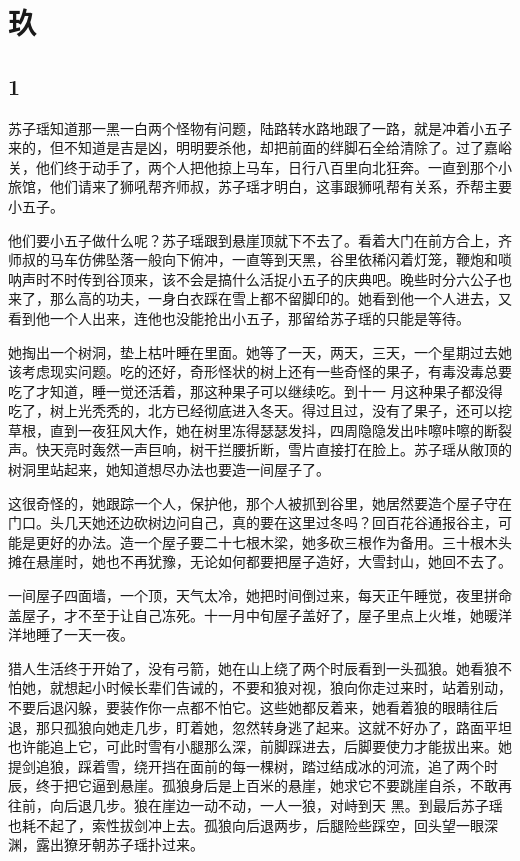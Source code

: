 \section{玖}

{\centering\subsection{1}}

苏子瑶知道那一黑一白两个怪物有问题，陆路转水路地跟了一路，就是冲着小五子来的，但不知道是吉是凶，明明要杀他，却把前面的绊脚石全给清除了。过了嘉峪关，他们终于动手了，两个人把他掠上马车，日行八百里向北狂奔。一直到那个小旅馆，他们请来了狮吼帮齐师叔，苏子瑶才明白，这事跟狮吼帮有关系，乔帮主要小五子。

他们要小五子做什么呢？苏子瑶跟到悬崖顶就下不去了。看着大门在前方合上，齐师叔的马车仿佛坠落一般向下俯冲，一直等到天黑，谷里依稀闪着灯笼，鞭炮和唢呐声时不时传到谷顶来，该不会是搞什么活捉小五子的庆典吧。晚些时分六公子也来了，那么高的功夫，一身白衣踩在雪上都不留脚印的。她看到他一个人进去，又看到他一个人出来，连他也没能抢出小五子，那留给苏子瑶的只能是等待。

她掏出一个树洞，垫上枯叶睡在里面。她等了一天，两天，三天，一个星期过去她该考虑现实问题。吃的还好，奇形怪状的树上还有一些奇怪的果子，有毒没毒总要吃了才知道，睡一觉还活着，那这种果子可以继续吃。到十一
月这种果子都没得吃了，树上光秃秃的，北方已经彻底进入冬天。得过且过，没有了果子，还可以挖草根，直到一夜狂风大作，她在树里冻得瑟瑟发抖，四周隐隐发出咔嚓咔嚓的断裂声。快天亮时轰然一声巨响，树干拦腰折断，雪片直接打在脸上。苏子瑶从敞顶的树洞里站起来，她知道想尽办法也要造一间屋子了。

这很奇怪的，她跟踪一个人，保护他，那个人被抓到谷里，她居然要造个屋子守在门口。头几天她还边砍树边问自己，真的要在这里过冬吗？回百花谷通报谷主，可能是更好的办法。造一个屋子要二十七根木梁，她多砍三根作为备用。三十根木头摊在悬崖时，她也不再犹豫，无论如何都要把屋子造好，大雪封山，她回不去了。

一间屋子四面墙，一个顶，天气太冷，她把时间倒过来，每天正午睡觉，夜里拼命盖屋子，才不至于让自己冻死。十一月中旬屋子盖好了，屋子里点上火堆，她暖洋洋地睡了一天一夜。

猎人生活终于开始了，没有弓箭，她在山上绕了两个时辰看到一头孤狼。她看狼不怕她，就想起小时候长辈们告诫的，不要和狼对视，狼向你走过来时，站着别动，不要后退闪躲，要装作你一点都不怕它。这些她都反着来，她看着狼的眼睛往后退，那只孤狼向她走几步，盯着她，忽然转身逃了起来。这就不好办了，路面平坦也许能追上它，可此时雪有小腿那么深，前脚踩进去，后脚要使力才能拔出来。她提剑追狼，踩着雪，绕开挡在面前的每一棵树，踏过结成冰的河流，追了两个时辰，终于把它逼到悬崖。孤狼身后是上百米的悬崖，她求它不要跳崖自杀，不敢再往前，向后退几步。狼在崖边一动不动，一人一狼，对峙到天
黑。到最后苏子瑶也耗不起了，索性拔剑冲上去。孤狼向后退两步，后腿险些踩空，回头望一眼深渊，露出獠牙朝苏子瑶扑过来。

